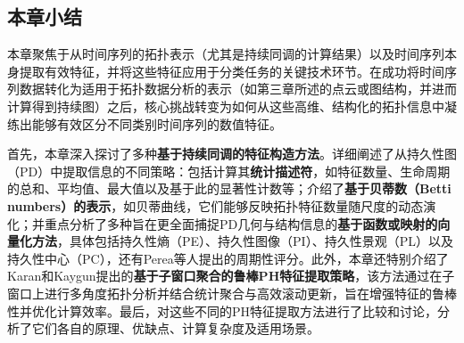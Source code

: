 \subsection{本章小结}
\label{sec:ch4_summary}
本章聚焦于从时间序列的拓扑表示（尤其是持续同调的计算结果）以及时间序列本身提取有效特征，并将这些特征应用于分类任务的关键技术环节。在成功将时间序列数据转化为适用于拓扑数据分析的表示（如第三章所述的点云或图结构，并进而计算得到持续图）之后，核心挑战转变为如何从这些高维、结构化的拓扑信息中凝练出能够有效区分不同类别时间序列的数值特征。

首先，本章深入探讨了多种\textbf{基于持续同调的特征构造方法}。详细阐述了从持久性图（PD）中提取信息的不同策略：包括计算其\textbf{统计描述符}，如特征数量、生命周期的总和、平均值、最大值以及基于此的显著性计数等\cite{mittal2017topological}；介绍了\textbf{基于贝蒂数（Betti numbers）的表示}，如贝蒂曲线，它们能够反映拓扑特征数量随尺度的动态演化\cite{umeda2019topological}；并重点分析了多种旨在更全面捕捉PD几何与结构信息的\textbf{基于函数或映射的向量化方法}，具体包括持久性熵（PE）\cite{atienza2020stability, atienza2018stability}、持久性图像（PI）\cite{adams2017persistence}、持久性景观（PL）\cite{1}以及持久性中心（PC）\cite{JSJC202406009}，还有Perea等人提出的周期性评分。此外，本章还特别介绍了Karan和Kaygun提出的\textbf{基于子窗口聚合的鲁棒PH特征提取策略}\cite{3}，该方法通过在子窗口上进行多角度拓扑分析并结合统计聚合与高效滚动更新，旨在增强特征的鲁棒性并优化计算效率。最后，对这些不同的PH特征提取方法进行了比较和讨论，分析了它们各自的原理、优缺点、计算复杂度及适用场景。

